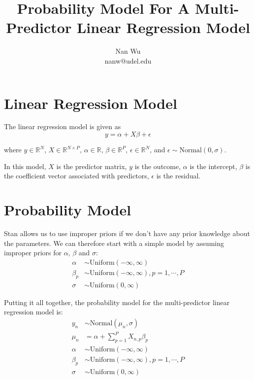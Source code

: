 \documentclass[12pt]{article}
\begin{document}
\title{Probability Model For A Multi-Predictor Linear Regression Model}
\author{Nan Wu \\ nanw@udel.edu}
\date{}
\maketitle

\section{Linear Regression Model}

The linear regression model is given as
\begin{equation}
y=\alpha+X\beta+\epsilon
\end{equation}

where $y\in \mathbb{R}^N$, $X\in \mathbb{R}^{N \times P}$, $\alpha \in \mathbb{R}$, $\beta \in \mathbb{R}^P$, $\epsilon \in \mathbb{R}^N$, and $\epsilon \sim \mathrm{Normal}\left( 0,\sigma \right)$.

In this model, $X$ is the predictor matrix, $y$ is the outcome, $\alpha$ is the intercept, $\beta$ is the coefficient vector associated with predictors, $\epsilon$ is the residual.

\section{Probability Model}

Stan allows us to use improper priors if we don't have any prior knowledge about the parameters. We can therefore start with a simple model by assuming improper priors for $\alpha$, $\beta$ and $\sigma$:
\begin{align*}
\alpha &\sim \mathrm{Uniform}\left( -\infty,\infty \right) \\
\beta_p &\sim \mathrm{Uniform}\left( -\infty,\infty \right), p=1,\cdots,P \\
\sigma &\sim \mathrm{Uniform}\left( 0,\infty \right)
\end{align*}

Putting it all together, the probability model for the multi-predictor linear regression model is:
\begin{align*}
y_n &\sim \mathrm{Normal}\left(\mu_n, \sigma \right) \\
\mu_n &= \alpha + \sum\limits_{p=1}^P X_{n,p}\beta_p \\
\alpha &\sim \mathrm{Uniform}\left( -\infty,\infty \right) \\
\beta_p &\sim \mathrm{Uniform}\left( -\infty,\infty \right), p=1,\cdots,P \\
\sigma &\sim \mathrm{Uniform}\left( 0,\infty \right)
\end{align*}
\end{document}
